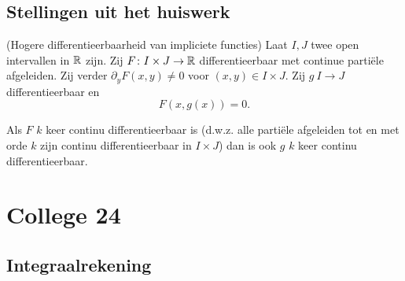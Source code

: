 \documentclass{2wa40summary}
\begin{document}
		\subsection{Stellingen uit het huiswerk}
			\theorem (Hogere differentieerbaarheid van impliciete functies)
				Laat $I,J$ twee open intervallen in $ \mathbb{R} $ zijn. Zij $F\colon I \times J \to \mathbb{R}$ differentieerbaar met continue parti\"ele afgeleiden. Zij verder $\partial_y F(x,y) \neq 0$ voor $(x,y) \in I \times J$. Zij $g\: I\to J$ differentieerbaar en \[ F(x,g(x)) = 0. \]
				
				Als $F$ $k$ keer continu differentieerbaar is (d.w.z. alle parti\"ele afgeleiden tot en met orde $k$ zijn continu differentieerbaar in $I \times J$) dan is ook $g$ $k$ keer continu differentieerbaar.		
				
		\newpage		
		\section{College 24}
		\subsection{Integraalrekening} 
\end{document}

